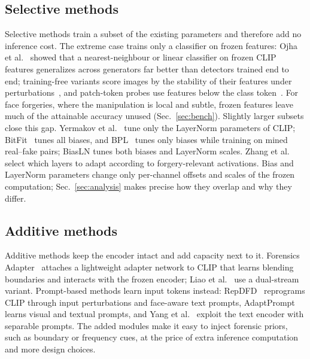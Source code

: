 \documentclass[fonts]{icst}
\begin{document}
\subsection{Selective methods}
Selective methods train a subset of the existing parameters and therefore add no inference cost. The extreme case trains only a classifier on frozen features: Ojha et al.~\cite{ojha2023universal} showed that a nearest-neighbour or linear classifier on frozen CLIP features generalizes across generators far better than detectors trained end to end; training-free variants score images by the stability of their features under perturbations~\cite{tsai2024trainingfree}, and patch-token probes use features below the class token~\cite{abdullah2026tap}. For face forgeries, where the manipulation is local and subtle, frozen features leave much of the attainable accuracy unused (Sec.~\ref{sec:bench}). Slightly larger subsets close this gap. Yermakov et al.~\cite{yermakov2025clip,yermakov2025gend} tune only the LayerNorm parameters of CLIP; BitFit~\cite{benzaken2022bitfit} tunes all biases, and BPL~\cite{xu2026bpl} tunes only biases while training on mined real--fake pairs; BiasLN tunes both biases and LayerNorm scales. Zhang et al.~\cite{zhang2026layermask} select which layers to adapt according to forgery-relevant activations. Bias and LayerNorm parameters change only per-channel offsets and scales of the frozen computation; Sec.~\ref{sec:analysis} makes precise how they overlap and why they differ.

\subsection{Additive methods}
Additive methods keep the encoder intact and add capacity next to it. Forensics Adapter~\cite{cui2025forada} attaches a lightweight adapter network to CLIP that learns blending boundaries and interacts with the frozen encoder; Liao et al.~\cite{liao2026dfa} use a dual-stream variant. Prompt-based methods learn input tokens instead: RepDFD~\cite{lin2025repdfd} reprograms CLIP through input perturbations and face-aware text prompts, AdaptPrompt~\cite{jiang2026adaptprompt} learns visual and textual prompts, and Yang et al.~\cite{yang2026separable} exploit the text encoder with separable prompts. The added modules make it easy to inject forensic priors, such as boundary or frequency cues, at the price of extra inference computation and more design choices.
\end{document}
